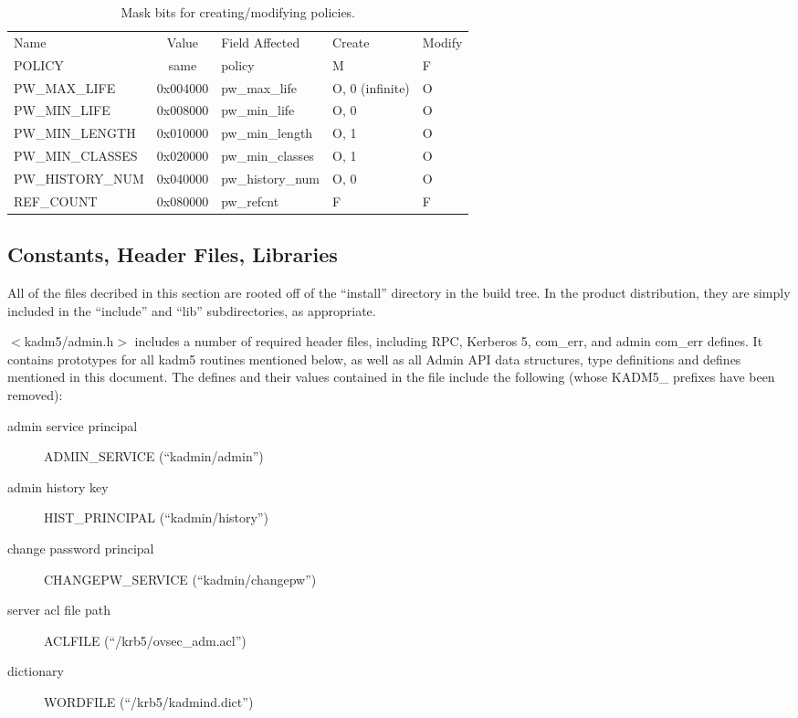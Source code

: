 \begin{table}[htbp]
\begin{tabular}{@{}lclll}
Name & Value & Field Affected & Create & Modify \\
POLICY                  & same     & policy & M & F \\
PW_MAX_LIFE             & 0x004000 & pw_max_life & O, 0 (infinite) & O \\
PW_MIN_LIFE             & 0x008000 & pw_min_life & O, 0 & O \\
PW_MIN_LENGTH           & 0x010000 & pw_min_length & O, 1 & O \\
PW_MIN_CLASSES          & 0x020000 & pw_min_classes & O, 1 & O \\
PW_HISTORY_NUM          & 0x040000 & pw_history_num & O, 0 & O \\
REF_COUNT               & 0x080000 & pw_refcnt & F & F
\end{tabular}
\caption{Mask bits for creating/modifying policies.}
\label{tab:policy-bits}
\end{table}

\subsection{Constants, Header Files, Libraries}

All of the files decribed in this section are rooted off of the
``install'' directory in the build tree.  In the product distribution,
they are simply included in the ``include'' and ``lib''
subdirectories, as appropriate.

$<$kadm5/admin.h$>$ includes a number of required header files,
including RPC, Kerberos 5, com_err, and admin com_err
defines.  It contains prototypes for all kadm5 routines mentioned
below, as well as all Admin API data structures, type definitions and
defines mentioned in this document.  The defines and their values
contained in the file include the following (whose KADM5_
prefixes have been removed):
\begin{description}
\item[admin service principal] ADMIN_SERVICE (``kadmin/admin'')
\item[admin history key] HIST_PRINCIPAL (``kadmin/history'')
\item[change password principal] CHANGEPW_SERVICE (``kadmin/changepw'')
\item[server acl file path] ACLFILE (``/krb5/ovsec_adm.acl'')
\item[dictionary] WORDFILE (``/krb5/kadmind.dict'')
\end{description}

